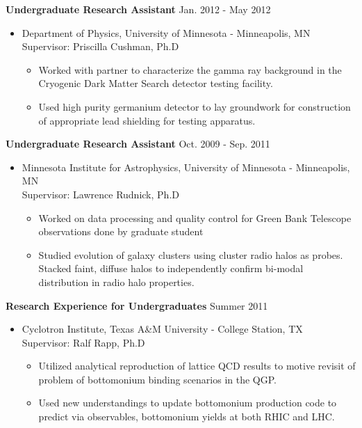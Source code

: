 \documentclass[10pt]{article}
\newenvironment{innerlist}[1][\enskip\textbullet]%
        {\begin{itemize}[#1,leftmargin=*,parsep=0pt,itemsep=0pt,topsep=0pt,partopsep=0pt]}
        {\end{itemize}}
\begin{document}
\textbf{Undergraduate Research Assistant} \hfill {Jan. 2012 - May 2012}
\begin{innerlist}

\item[] Department of Physics, University of Minnesota - Minneapolis, MN\\
		Supervisor: Priscilla Cushman, Ph.D
		\iflong
		\begin{innerlist}		
		\item Worked with partner to characterize the gamma ray background in the 
		Cryogenic Dark Matter Search detector testing facility.
		\item Used high purity germanium detector to lay groundwork for construction
		of appropriate lead shielding for testing apparatus.
		\end{innerlist}
		\fi
\end{innerlist}

\textbf{Undergraduate Research Assistant} \hfill {Oct. 2009 - Sep. 2011}
\begin{innerlist}

\item[] Minnesota Institute for Astrophysics, University of Minnesota - Minneapolis, MN\\
		Supervisor: Lawrence Rudnick, Ph.D
		\iflong
		\begin{innerlist}
		\item Worked on data processing and quality control for Green Bank Telescope
		observations done by graduate student
		\item Studied evolution of galaxy clusters using cluster radio halos as probes. Stacked
		faint, diffuse halos to independently confirm bi-modal distribution in radio halo properties.
		\end{innerlist}
		\fi
\end{innerlist}

\textbf{Research Experience for Undergraduates} \hfill {Summer 2011}
\begin{innerlist}

\item[] Cyclotron Institute, Texas A\&M University - College Station, TX\\
        Supervisor: Ralf Rapp, Ph.D
        \iflong
        \begin{innerlist}
        \item Utilized analytical reproduction of lattice QCD results to motive revisit
        of problem of bottomonium binding scenarios in the QGP.
        \item Used new understandings to update bottomonium production code to predict 
        via observables, bottomonium yields at both RHIC and LHC.
        \end{innerlist}
        \fi
\end{innerlist}
\end{document}
